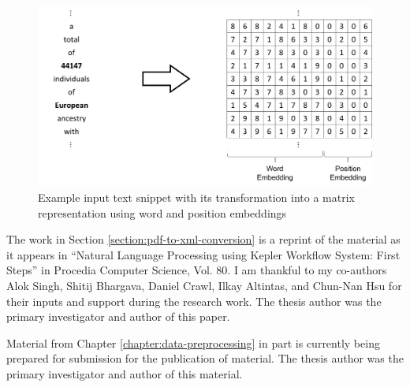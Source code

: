 \vspace{0.1in}
\begin{figure}[ht]
    \centering
    \includegraphics[width=0.85\linewidth]{Images/Embeddings-Example.png}
    \caption{Example input text snippet with its transformation into a matrix representation using word and position embeddings}
    \label{figure:embeddings-example}
\end{figure}

The work in Section \ref{section:pdf-to-xml-conversion} is a reprint of the material as it appears in ``Natural Language Processing using Kepler Workflow System: First Steps'' in Procedia Computer Science, Vol. 80. I am thankful to my co-authors Alok Singh, Shitij Bhargava, Daniel Crawl, Ilkay Altintas, and Chun-Nan Hsu for their inputs and support during the research work. The thesis author was the primary investigator and author of this paper.  

Material from Chapter \ref{chapter:data-preprocessing} in part is currently being prepared for submission for the publication of material. The thesis author was the primary investigator and author of this material.